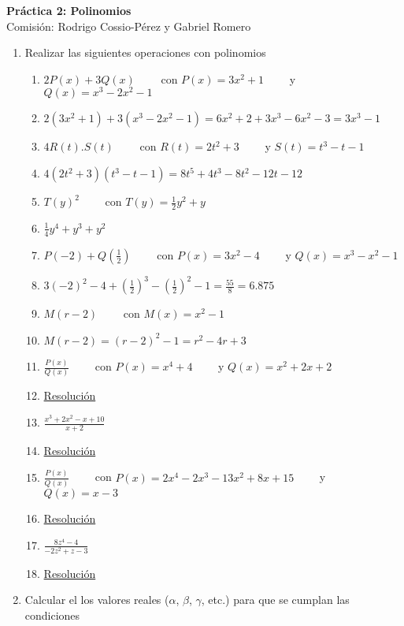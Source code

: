\documentclass[a4paper]{article}
\newcommand{\answer}{\item[**]}
\newcommand{\exercise}{\item}
\newcommand{\df}[2]{\displaystyle\frac{#1}{#2}}
\begin{document}
\noindent \hrulefill 
\vspace{-7pt}
\begin{center} 
	\textbf{ Práctica 2: Polinomios } \\
	Comisión: Rodrigo Cossio-Pérez y Gabriel Romero
\end{center}
\vspace{-10pt}
\hrulefill


\begin{enumerate}

	\exercise Realizar las siguientes operaciones con polinomios
	\begin{enumerate} [label=(\alph*)]
		
		\item $2P(x)+3Q(x)$ ~~~~con $P(x)=3x^2+1$ ~~~~y $Q(x)=x^3-2x^2-1$
		\answer $2(3x^2+1)+3(x^3-2x^2-1)=6x^2+2+3x^3-6x^2-3=3x^3-1$

		\item $4R(t).S(t)$ ~~~~con $R(t)=2t^2+3$ ~~~~y $S(t)=t^3-t-1$
		\answer $4(2t^2+3)(t^3-t-1)=8t^5+4t^3-8t^2-12t-12$ 

		\item $T(y)^2$ ~~~~con $T(y)=\df{1}{2}y^2+y$
		\answer $\df{1}{4}y^4+y^3+y^2$

		\item $P(-2)+Q\left(\df{1}{2}\right)$ ~~~~con $P(x)=3x^2-4$ ~~~~y $Q(x)=x^3-x^2-1$
		\answer $3(-2)^2-4+\left(\df{1}{2}\right)^3-\left(\df{1}{2}\right)^2-1=\df{55}{8} = 6.875$

		\item $M(r-2)$ ~~~~con $M(x)=x^2-1$
		\answer $M(r-2)=(r-2)^2-1=r^2-4r+3$

		\item $\df{P(x)}{Q(x)}$ ~~~~con $P(x)=x^4+4$ ~~~~y $Q(x)=x^2+2x+2$
		\answer \href{https://youtu.be/DWDi7BKAKbc}{Resolución}

		\item $\df{x^3+2x^2-x+10}{x+2}$
		\answer \href{https://youtu.be/bfCWsvZfFq0}{Resolución}

		\item $\df{P(x)}{Q(x)}$ ~~~~con $P(x)=2x^4-2x^3-13x^2+8x+15$ ~~~~y $Q(x)=x-3$
		\answer \href{https://youtu.be/W3HcTD4IC94}{Resolución}

		\item $\df{8z^4-4}{-2z^2+z-3}$
		\answer \href{https://youtu.be/0Dw3MAwrA34}{Resolución}

	\end{enumerate}

	\exercise Calcular el los valores reales ($\alpha$, $\beta$, $\gamma$, etc.) para que se cumplan las condiciones
	\begin{enumerate} [label=(\alph*)]
		

\end{enumerate}
\end{enumerate}
\end{document}
